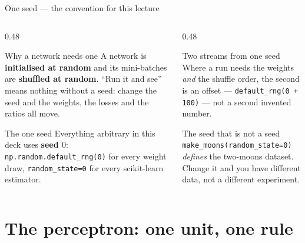 \documentclass[aspectratio=169]{beamer}
\begin{document}
\begin{frame}[shrink=6]{One seed --- the convention for this lecture}
  \begin{columns}[T]
    \begin{column}{0.48\textwidth}
      \begin{alertblock}{Why a network needs one}
        \small A network is \textbf{initialised at random} and its
        mini-batches are \textbf{shuffled at random}. ``Run it and see'' means
        nothing without a seed: change the seed and the weights, the losses
        and the ratios all move.
      \end{alertblock}
      \begin{block}{The one seed}
        \small Everything arbitrary in this deck uses \textbf{seed $0$}:
        \texttt{np.random.default\_rng(0)} for every weight draw,
        \texttt{random\_state=0} for every scikit-learn estimator.
      \end{block}
    \end{column}
    \begin{column}{0.48\textwidth}
      \begin{block}{Two streams from one seed}
        \small Where a run needs the weights \emph{and} the shuffle order,
        the second is an offset --- \texttt{default\_rng(0 + 100)} --- not a
        second invented number.
      \end{block}
      \begin{exampleblock}{The seed that is not a seed}
        \small \texttt{make\_moons(random\_state=0)} \emph{defines} the
        two-moons dataset. Change it and you have different data, not a
        different experiment.
      \end{exampleblock}
    \end{column}
  \end{columns}
\end{frame}

\section[The perceptron]{The perceptron: one unit, one rule}
\label{sec:perc}
\end{document}

